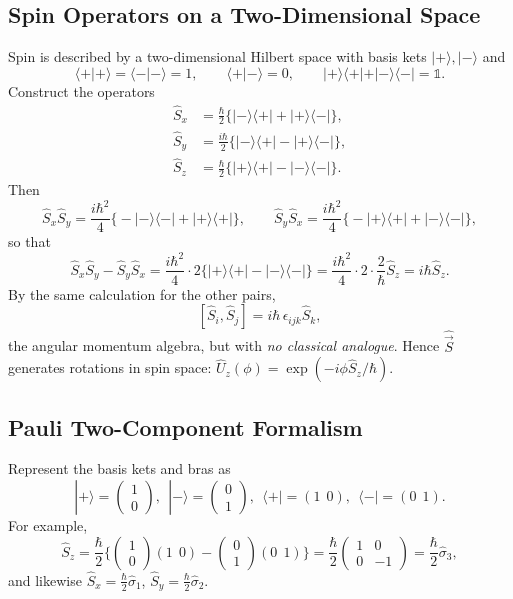 \documentclass[11pt,a4paper]{article}
\begin{document}
\subsection{Spin Operators on a Two-Dimensional Space}
Spin is described by a two-dimensional Hilbert space with basis kets $|+\rangle,|-\rangle$ and
\[
\langle+|+\rangle=\langle-|-\rangle=1,\qquad\langle+|-\rangle=0,\qquad |+\rangle\langle+|+|-\rangle\langle-|=\mathbb 1 .
\]
Construct the operators
\begin{align*}
\hat S_x&=\frac\hbar2\big\{|-\rangle\langle+|+|+\rangle\langle-|\big\},\\
\hat S_y&=\frac{i\hbar}2\big\{|-\rangle\langle+|-|+\rangle\langle-|\big\},\\
\hat S_z&=\frac\hbar2\big\{|+\rangle\langle+|-|-\rangle\langle-|\big\}.
\end{align*}
Then
\[
\hat S_x\hat S_y=\frac{i\hbar^2}4\big\{-|-\rangle\langle-|+|+\rangle\langle+|\big\},\qquad
\hat S_y\hat S_x=\frac{i\hbar^2}4\big\{-|+\rangle\langle+|+|-\rangle\langle-|\big\},
\]
so that
\[
\hat S_x\hat S_y-\hat S_y\hat S_x=\frac{i\hbar^2}4\cdot2\big\{|+\rangle\langle+|-|-\rangle\langle-|\big\}=\frac{i\hbar^2}4\cdot2\cdot\frac2\hbar\hat S_z=i\hbar\hat S_z .
\]
By the same calculation for the other pairs,
\[
[\hat S_i,\hat S_j]=i\hbar\,\epsilon_{ijk}\hat S_k ,
\]
the angular momentum algebra, but with \emph{no classical analogue}. Hence $\hat{\vec S}$ generates rotations in spin space: $\hat U_z(\phi)=\exp(-i\phi\hat S_z/\hbar)$.

\subsection{Pauli Two-Component Formalism}
Represent the basis kets and bras as
\[
|+\rangle=\begin{pmatrix}1\\0\end{pmatrix},\ \ |-\rangle=\begin{pmatrix}0\\1\end{pmatrix},\ \ \langle+|=(1\ \ 0),\ \ \langle-|=(0\ \ 1).
\]
For example,
\[
\hat S_z=\frac\hbar2\Big\{\begin{pmatrix}1\\0\end{pmatrix}(1\ \ 0)-\begin{pmatrix}0\\1\end{pmatrix}(0\ \ 1)\Big\}=\frac\hbar2\begin{pmatrix}1&0\\0&-1\end{pmatrix}=\frac\hbar2\hat\sigma_3 ,
\]
and likewise $\hat S_x=\tfrac\hbar2\hat\sigma_1$, $\hat S_y=\tfrac\hbar2\hat\sigma_2$.
\end{document}
